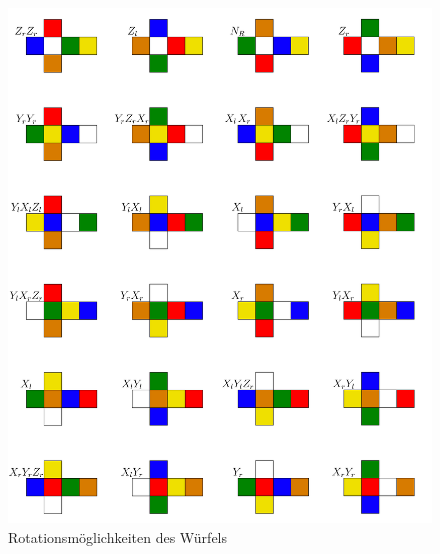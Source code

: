 \documentclass[12pt,a4paper, usenames, dvipsnames]{article}
\theoremstyle{mystyle}
\theoremstyle{definition}
\begin{document}
\begin{figure}[H]
\centering
\includegraphics[scale=0.06]{AlleRotationen.png}
\caption{Rotationsmöglichkeiten des Würfels}
\label{AbbildungWürfelRotationAlleSeiten}
\end{figure}
\end{document}
